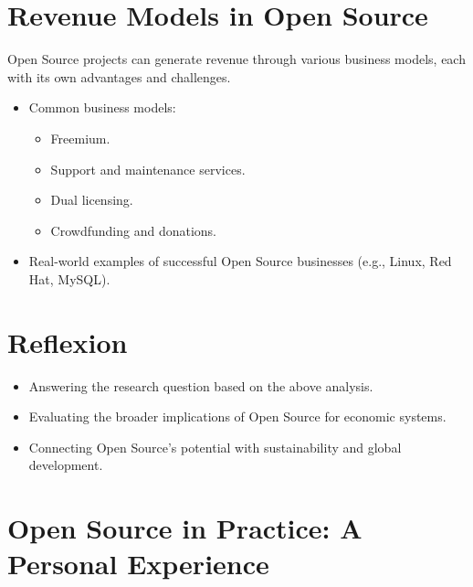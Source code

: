 \section{Revenue Models in Open Source}

Open Source projects can generate revenue through various business models, each with its own advantages and challenges.

\begin{itemize}
    \item Common business models:
    \begin{itemize}
        \item Freemium.
        \item Support and maintenance services.
        \item Dual licensing.
        \item Crowdfunding and donations.
    \end{itemize}
    \item Real-world examples of successful Open Source businesses (e.g., Linux, Red Hat, MySQL).
\end{itemize}

\section{Reflexion}

\begin{itemize}
    \item Answering the research question based on the above analysis.
    \item Evaluating the broader implications of Open Source for economic systems.
    \item Connecting Open Source's potential with sustainability and global development.
\end{itemize}

\section{Open Source in Practice: A Personal Experience}

